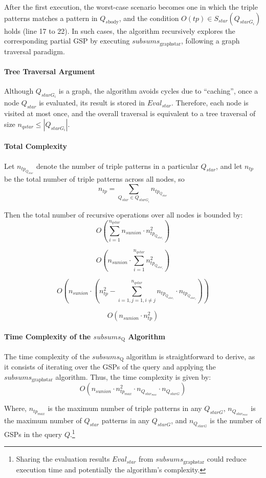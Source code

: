 After the first execution, the worst-case scenario becomes one in which the triple patterns matches a pattern in $Q_{s\mathrm{body}}$, and the condition $O(tp) \in S_{star}(Q_{starG_i})$ holds (line 17 to 22).
In such cases, the algorithm recursively explores the corresponding partial \ac{GSP} by executing $subsums_{\mathrm{graph star}}$, following a graph traversal paradigm.


\paragraph{Tree Traversal Argument}
Although $Q_{starG_i}$ is a graph, the algorithm avoids cycles due to ``caching'', once a node $Q_{star}$ is evaluated, its result is stored in $Eval_{star}$.
Therefore, each node is visited at most once, and the overall traversal is equivalent to a tree traversal of size $n_{qstar} \leq |Q_{starG_i}|$.

\paragraph{Total Complexity}
Let $n_{tp_{Q_{star}}}$ denote the number of triple patterns in a particular $Q_{star}$, and let $n_{tp}$ be the total number of triple patterns across all nodes, so
$$
	n_{tp} = \sum_{Q_{star} \in Q_{starG_i}} n_{tp_{Q_{star}}}
$$

Then the total number of recursive operations over all nodes is bounded by:
$$
	O\left(\sum_{i=1}^{n_{qstar}} n_{sunion} \cdot n_{tp_{Q_{star_i}}}^{2}\right)
$$

$$
	O\left(n_{sunion} \cdot \sum_{i=1}^{n_{qstar}} n_{tp_{Q_{star_i}}}^{2}\right)
$$

$$
	O\left(n_{sunion} \cdot \left(n_{tp}^{2} - \sum_{i=1, j=1, i \neq j}^{n_{qstar}}  n_{tp_{Q_{star_i}}} \cdot  n_{tp_{Q_{star_j}}}\right)\right)
$$

$$
	O\left(n_{sunion} \cdot n_{tp}^{2}\right)
$$

\paragraph{Time Complexity of the $subsums_{\mathrm{Q}}$ Algorithm}



The time complexity of the $subsums_{\mathrm{Q}}$ algorithm is straightforward to derive, as it consists of iterating over the \acp{GSP} of the query and applying the $subsums_{\mathrm{graph star}}$ algorithm. Thus, the time complexity is given by:
\begin{equation}
	O\left(n_{sunion} \cdot n_{tp_{max}}^{2} \cdot n_{Q_{star_{max}}} \cdot n_{Q_{starG}}\right)
\end{equation}

Where, $n_{tp_{max}}$ is the maximum number of triple patterns in any $Q_{starG}$,
$n_{Q_{star_{max}}}$ is the maximum number of $Q_{star}$ patterns in any $Q_{starG}$, and
$n_{Q_{starG}}$ is the number of \acp{GSP} in the query $Q$.\footnote{
	Sharing the evaluation results $Eval_{star}$ from $subsums_{\mathrm{graph star}}$ could reduce execution time and potentially the algorithm's complexity.
}
